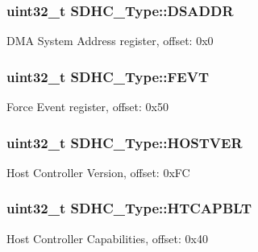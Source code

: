 \subsubsection[{\texorpdfstring{D\+S\+A\+D\+DR}{DSADDR}}]{ uint32\+\_\+t S\+D\+H\+C\+\_\+\+Type\+::\+D\+S\+A\+D\+DR}\hypertarget{structSDHC__Type_ac1199644a3e0befa110f6f40108cd873}{}\label{structSDHC__Type_ac1199644a3e0befa110f6f40108cd873}
D\+MA System Address register, offset\+: 0x0 
\subsubsection[{\texorpdfstring{F\+E\+VT}{FEVT}}]{ uint32\+\_\+t S\+D\+H\+C\+\_\+\+Type\+::\+F\+E\+VT}\hypertarget{structSDHC__Type_aca68d1c0500d041506d802b73756d947}{}\label{structSDHC__Type_aca68d1c0500d041506d802b73756d947}
Force Event register, offset\+: 0x50 
\subsubsection[{\texorpdfstring{H\+O\+S\+T\+V\+ER}{HOSTVER}}]{ uint32\+\_\+t S\+D\+H\+C\+\_\+\+Type\+::\+H\+O\+S\+T\+V\+ER}\hypertarget{structSDHC__Type_a45a54237012b5f5aab3e48c11a527a0b}{}\label{structSDHC__Type_a45a54237012b5f5aab3e48c11a527a0b}
Host Controller Version, offset\+: 0x\+FC 
\subsubsection[{\texorpdfstring{H\+T\+C\+A\+P\+B\+LT}{HTCAPBLT}}]{ uint32\+\_\+t S\+D\+H\+C\+\_\+\+Type\+::\+H\+T\+C\+A\+P\+B\+LT}\hypertarget{structSDHC__Type_a151bd21debba72fa06e91dbe8ba669a5}{}\label{structSDHC__Type_a151bd21debba72fa06e91dbe8ba669a5}
Host Controller Capabilities, offset\+: 0x40 
